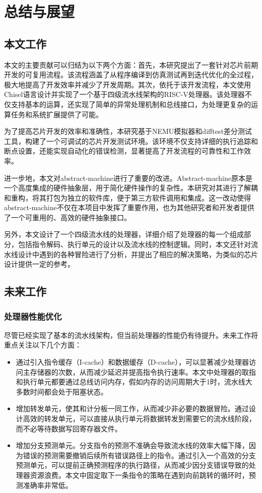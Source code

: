 \chapter{总结与展望}

\section{本文工作}

本文的主要贡献可以归结为以下两个方面：首先，本研究提出了一套针对芯片前期开发的可复用流程。该流程涵盖了从程序编译到仿真测试再到迭代优化的全过程，极大地提高了开发效率并减少了开发周期。其次，依托于该开发流程，本文使用Chisel语言设计并实现了一个基于四级流水线架构的RISC-V处理器。该处理器不仅支持基本的运算，还实现了简单的异常处理机制和总线接口，为处理更复杂的运算任务和系统扩展提供了可能。

为了提高芯片开发的效率和准确性，本研究基于NEMU模拟器和difftest差分测试工具，构建了一个可调试的芯片开发测试环境。该环境不仅支持详细的执行追踪和断点设置，还能实现自动化的错误检测，显著提高了开发流程的可靠性和工作效率。

进一步地，本文对abstract-machine进行了重要的改进。Abstract-machine原本是一个高度集成的硬件抽象层，用于简化硬件操作的复杂性。本研究对其进行了解耦和重构，将其打包为独立的软件库，便于第三方软件调用和集成。这一改动使得abstract-machine不仅在本项目中发挥了重要作用，也为其他研究者和开发者提供了一个可重用的、高效的硬件抽象接口。

另外，本文设计了一个四级流水线的处理器，详细介绍了处理器的每一个组成部分，包括指令解码、执行单元的设计以及流水线的控制逻辑。同时，本文还针对流水线设计中遇到的各种冒险进行了分析，并提出了相应的解决策略，为类似的芯片设计提供一定的参考。

\section{未来工作}

\subsection{处理器性能优化}

尽管已经实现了基本的流水线架构，但当前处理器的性能仍有待提升。未来工作将重点关注以下几个方面：

\begin{itemize}
    \item 通过引入指令缓存（I-cache）和数据缓存（D-cache），可以显著减少处理器访问主存储器的次数，从而减少延迟并提高指令执行速率。本文中处理器的取指和执行单元都要通过总线访问内存，假如内存的访问周期大于1时，流水线大多数时间都会处于阻塞状态。
    \item 增加转发单元，使其和计分板一同工作，从而减少非必要的数据冒险。通过设计高效的转发单元，可以直接从执行单元将数据转发到需要它的流水线阶段，而不必等待数据写回寄存器文件。
    \item 增加分支预测单元。分支指令的预测不准确会导致流水线的效率大幅下降，因为错误的预测需要撤销后续所有错误路径上的指令。通过引入一个高效的分支预测单元，可以提前正确预测程序的执行路径，从而减少因分支错误导致的处理器资源浪费。本文中固定取下一条指令的策略在遇到向前跳转的循环时，预测准确率非常低。
\end{itemize}

